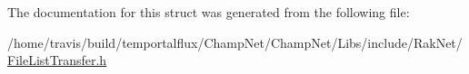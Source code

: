 The documentation for this struct was generated from the following file\-:\begin{DoxyCompactItemize}
\item 
/home/travis/build/temportalflux/\-Champ\-Net/\-Champ\-Net/\-Libs/include/\-Rak\-Net/\hyperlink{_file_list_transfer_8h}{File\-List\-Transfer.\-h}\end{DoxyCompactItemize}
